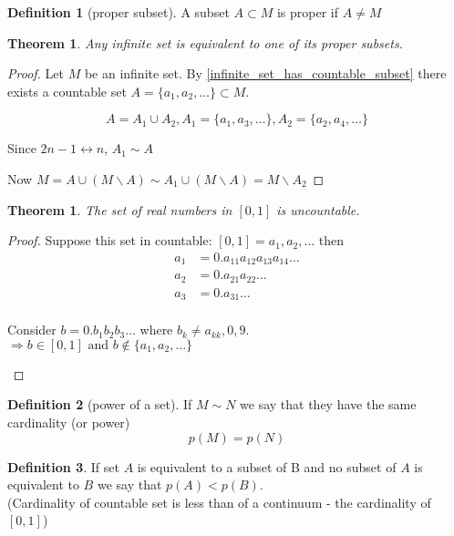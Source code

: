 \documentclass[11pt,a4paper]{report}
\newtheorem{theorem}{Theorem}[section]
\theoremstyle{plain}
\newtheorem{thm}{Theorem}[section]
\theoremstyle{definition}
\newtheorem*{defn}{Definition}
\theoremstyle{remark}
\newcommand{\contradiction}{\begin{flushright} \textreferencemark \end{flushright}}
\begin{document}
\begin{defn}[proper subset]
  A subset $A \subset M$ is proper if $A \neq M$
\end{defn}

\begin{thm}
Any infinite set is equivalent to one of its proper subsets.
\end{thm}

\begin{proof}
    Let $M$ be an infinite set. By \ref{infinite_set_has_countable_subset}
  there exists a countable set $A = \{a_1, a_2, \dots\} \subset M$.

  \[ A = A_1 \cup A_2, A_1= \{a_1, a_3, \dots\}, A_2 = \{a_2, a_4, \dots\}\]

  Since $2n - 1 \leftrightarrow n$, $A_1 \sim A$

  Now $M = A \cup (M\backslash A) \sim A_1 \cup (M \backslash A) = M \backslash A_2$ 
\end{proof}

\begin{theorem}
  The set of real numbers in $[0,1]$ is uncountable.
\end{theorem}

\begin{proof}
  Suppose this set in countable: $[0,1] = {a_1, a_2, \dots}$ then
  \begin{align*}
    a_1 &= 0. a_{11} a_{12} a_{13} a_{14} \dots \\
    a_2 &= 0. a_{21} a_{22} \dots \\
    a_3 &= 0. a_{31} \dots \\
  \end{align*}

  Consider $b = 0. b_1 b_2 b_3 \dots$ where $b_k \neq a_{kk}, 0, 9$.\\
  $\Rightarrow b \in [0,1] \text{ and } b\notin \{a_1, a_2, \dots\}$ 
  \contradiction
\end{proof}

\begin{defn}[power of a set]
  If $M \sim N$ we say that they have the same cardinality (or power) \[p(M) = p(N)\]
\end{defn}

\begin{defn}
  If set $A$ is equivalent to a subset of B and no subset of $A$ is equivalent to $B$ we say that $p(A) < p(B)$.\\
  (Cardinality of countable set is less than of a continuum - the cardinality of $[0,1]$)
\end{defn}
\end{document}
